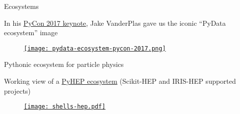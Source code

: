 \begin{frame}{Ecosystems}
\vspace{0.25 cm}
\begin{center}
    {\small In his \href{https://youtu.be/ZyjCqQEUa8o}{PyCon 2017 keynote}, Jake VanderPlas gave us the iconic ``PyData ecosystem'' image}
\end{center}

\vspace{0.1 cm}
\begin{figure}
    \begin{center}
        \href{https://coiled.io/blog/pydata-dask/}{\texttt{[image: pydata-ecosystem-pycon-2017.png]}}
    \end{center}
\end{figure}
\end{frame}

\begin{frame}{Pythonic ecosystem for particle physics}
\vspace{0.25 cm}
\begin{center}
    {\small Working view of a \href{https://hepsoftwarefoundation.org/workinggroups/pyhep.html}{PyHEP ecosystem} (Scikit-HEP and IRIS-HEP supported projects)}
\end{center}

\begin{figure}
    \begin{center}
        \href{https://indico.cern.ch/event/1140031/}{\texttt{[image: shells-hep.pdf]}}
    \end{center}
\end{figure}
\end{frame}


